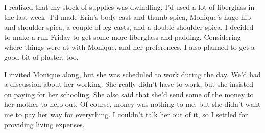 I realized that my stock of supplies was dwindling. I'd used a lot of fiberglass in the
last week- I'd made Erin's body cast and thumb spica, Monique's huge hip and shoulder spica, a
couple of leg casts, and a double shoulder spica. I decided to make a run Friday to get some
more fiberglass and padding. Considering where things were at with Monique, and her preferences,
I also planned to get a good bit of plaster, too.

I invited Monique along, but she was scheduled to work during the day. We'd had a
discussion about her working. She really didn't have to work, but she insisted on paying for her
schooling. She also said that she'd send some of the money to her mother to help out. Of course,
money was nothing to me, but she didn't want me to pay her way for everything. I couldn't talk
her out of it, so I settled for providing living expenses.

